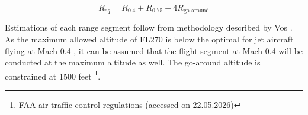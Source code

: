 

\begin{equation}
\label{eq:fuel_mass_fraction_range}
    R_{eq} =  R_{0.4}+R_{0.75}+4R_\text{go-around}
\end{equation}

Estimations of each range segment follow from methodology described by Vos \cite{Vos}. As the maximum allowed altitude of FL270 is below the optimal for jet aircraft flying at Mach 0.4 \cite{Koutz1952Loitering}, it can be assumed that the flight segment at Mach 0.4 will be conducted at the maximum altitude as well. %
The go-around altitude is constrained at 1500 feet \footnote{\href{https://www.faa.gov/air_traffic/publications/atpubs/aim_html/chap4_section_3.html?utm_source=chatgpt.com}{FAA air traffic control regulations} (accessed on 22.05.2026)}. %

